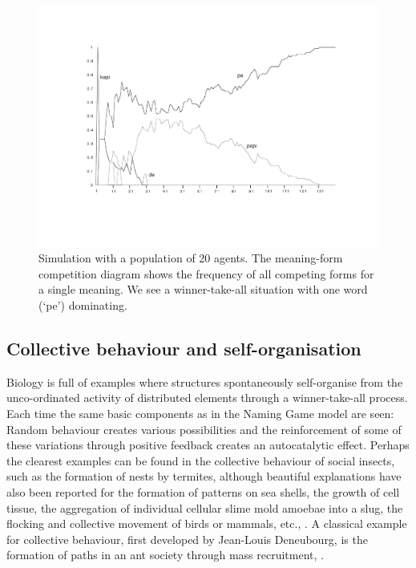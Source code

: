 \begin{figure}[htbp]
  \centerline{\includegraphics[width=\textwidth]{chap5/figs/comp1.pdf}}
\caption{\label{competition}Simulation with 
a population of 20 agents. The meaning-form competition 
diagram shows the frequency of all competing forms for a 
single meaning. We see a winner-take-all situation
with one word (`pe') dominating.}
\end{figure}

\subsection{Collective behaviour and self-organisation}

Biology is full of examples where structures spontaneously 
self-organise from the unco-ordinated activity 
of distributed elements through a winner-take-all process.
Each time the same basic components as in the Naming Game model
are seen: Random behaviour creates various possibilities and the 
reinforcement of some of these variations through positive
feedback creates an autocatalytic effect. 
Perhaps the clearest examples can be found 
in the collective behaviour of 
social insects, such as the formation of nests by termites, 
although beautiful explanations have also been reported
for the formation of patterns on sea shells, the growth of
cell tissue, the aggregation
of individual cellular slime mold amoebae into a slug, 
the flocking and collective movement of birds or mammals, 
etc., \cite{Meinhardt:1982}. A classical 
example for collective behaviour, first developed by Jean-Louis 
Deneubourg, is the formation of paths in an ant society through 
mass recruitment, \cite{Pasteels:1987}. 

